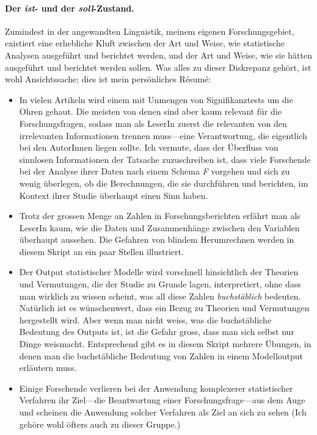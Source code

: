 \documentclass[oneside, 10pt]{book}\usepackage[]{graphicx}\usepackage[]{xcolor}
\begin{document}
\paragraph{Der \textit{ist}- und der \textit{soll}-Zustand.}
Zumindest in der angewandten Linguistik, meinem eigenen Forschungsgebiet,
existiert eine erhebliche Kluft zwischen der Art und Weise,
wie statistische Analysen ausgeführt und berichtet werden,
und der Art und Weise, wie sie hätten ausgeführt und berichtet werden sollen.
Was alles zu dieser Diskrepanz gehört, ist wohl Ansichtssache;
dies ist mein persönliches Résumé:
\begin{itemize}
  \item In vielen Artikeln wird einem mit Unmengen von Signifikanztests
  um die Ohren gehaut. Die meisten von denen sind aber kaum relevant
  für die Forschungsfragen, sodass man als LeserIn zuerst
  die relevanten von den irrelevanten Informationen trennen muss---eine
  Verantwortung, die eigentlich bei den AutorInnen liegen sollte. 
  Ich vermute, dass der Überfluss von sinnlosen Informationen der Tatsache
  zuzuschreiben ist, dass viele Forschende bei der Analyse ihrer
  Daten nach einem Schema \textit{F} vorgehen und sich zu wenig überlegen,
  ob die Berechnungen, die sie durchführen und berichten,
  im Kontext ihrer Studie überhaupt einen Sinn haben.
  
  \item Trotz der grossen Menge an Zahlen in Forschungsberichten
  erfährt man als LeserIn kaum, wie die Daten und Zusammenhänge
  zwischen den Variablen überhaupt aussehen. Die Gefahren
  von blindem Herumrechnen werden in diesem Skript an ein paar 
  Stellen illustriert.
  
  \item Der Output statistischer Modelle wird vorschnell
  hinsichtlich der Theorien und Vermutungen, die der Studie
  zu Grunde lagen, interpretiert, ohne dass man wirklich zu wissen scheint, was
  all diese Zahlen \emph{buchstäblich} bedeuten. Natürlich
  ist es wünschenwert, dass ein Bezug zu Theorien
  und Vermutungen hergestellt wird. Aber wenn man nicht weiss,
  was die buchstäbliche Bedeutung des Outputs ist, ist die Gefahr
  gross, dass man sich selbst nur Dinge weismacht. Entsprechend
  gibt es in diesem Skript mehrere Übungen, in denen man die buchstäbliche
  Bedeutung von Zahlen in einem Modelloutput erläutern muss.
  
  \item Einige Forschende verlieren bei der Anwendung komplexerer
  statistischer Verfahren ihr Ziel---die Beantwortung einer
  Forschungsfrage---aus dem Auge und scheinen die Anwendung solcher
  Verfahren als Ziel an sich zu sehen 
  (Ich gehöre wohl öfters auch zu dieser Gruppe.)
\end{itemize}
\end{document}
